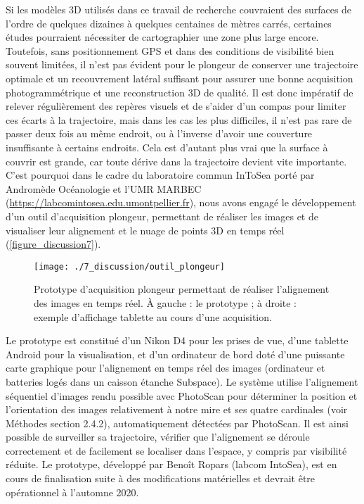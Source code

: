 Si les modèles 3D utilisés dans ce travail de recherche couvraient des surfaces de l’ordre de quelques dizaines à quelques centaines de mètres carrés, certaines études pourraient nécessiter de cartographier une zone plus large encore. Toutefois, sans positionnement GPS et dans des conditions de visibilité bien souvent limitées, il n’est pas évident pour le plongeur de conserver une trajectoire optimale et un recouvrement latéral suffisant pour assurer une bonne acquisition photogrammétrique et une reconstruction 3D de qualité. Il est donc impératif de relever régulièrement des repères visuels et de s’aider d’un compas pour limiter ces écarts à la trajectoire, mais dans les cas les plus difficiles, il n’est pas rare de passer deux fois au même endroit, ou à l’inverse d’avoir une couverture insuffisante à certains endroits. Cela est d’autant plus vrai que la surface à couvrir est grande, car toute dérive dans la trajectoire devient vite importante. C’est pourquoi dans le cadre du laboratoire commun InToSea porté par Andromède Océanologie et l’UMR MARBEC (\href{https://labcomintosea.edu.umontpellier.fr}{https://labcomintosea.edu.umontpellier.fr}), nous avons engagé le développement d’un outil d’acquisition plongeur, permettant de réaliser les images et de visualiser leur alignement et le nuage de points 3D en temps réel (\autoref{figure_discussion7}). 

\begin{figure}[H]
	\begin{center}
	\texttt{[image: ./7\_discussion/outil\_plongeur]}
		\caption[Prototype d’acquisition plongeur permettant de réaliser l’alignement des images en temps réel]{Prototype d’acquisition plongeur permettant de réaliser l’alignement des images en temps réel. À gauche : le prototype ; à droite : exemple d’affichage tablette au cours d’une acquisition.}
	\label{figure_discussion7}
\end{center}
\end{figure}

Le prototype est constitué d’un Nikon D4 pour les prises de vue, d’une tablette Android pour la visualisation, et d’un ordinateur de bord doté d’une puissante carte graphique pour l’alignement en temps réel des images (ordinateur et batteries logés dans un caisson étanche Subspace). Le système utilise l’alignement séquentiel d’images rendu possible avec PhotoScan pour déterminer la position et l’orientation des images relativement à notre mire et ses quatre cardinales (voir Méthodes section 2.4.2), automatiquement détectées par PhotoScan. Il est ainsi possible de surveiller sa trajectoire, vérifier que l’alignement se déroule correctement et de facilement se localiser dans l’espace, y compris par visibilité réduite. Le prototype, développé par Benoît Ropars (labcom IntoSea), est en cours de finalisation suite à des modifications matérielles et devrait être opérationnel à l’automne 2020.

